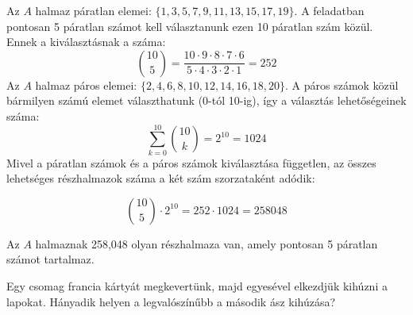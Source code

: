 \begin{solution}
Az $A$ halmaz páratlan elemei: $\{1,3,5,7,9,11,13,15,17,19\}$. A
feladatban pontosan 5 páratlan számot kell választanunk ezen 10 páratlan
szám közül. Ennek a kiválasztásnak a száma: 
\[
\binom{10}{5}=\frac{10\cdot9\cdot8\cdot7\cdot6}{5\cdot4\cdot3\cdot2\cdot1}=252
\]
Az $A$ halmaz páros elemei: $\{2,4,6,8,10,12,14,16,18,20\}$. A páros
számok közül bármilyen számú elemet választhatunk (0-tól 10-ig), így
a választás lehetőségeinek száma: 
\[
\sum_{k=0}^{10}\binom{10}{k}=2^{10}=1024
\]
Mivel a páratlan számok és a páros számok kiválasztása független,
az összes lehetséges részhalmazok száma a két szám szorzataként adódik:

\[
\binom{10}{5}\cdot2^{10}=252\cdot1024=258048
\]

Az $A$ halmaznak 258,048 olyan részhalmaza van, amely pontosan 5
páratlan számot tartalmaz. 
\end{solution}
\begin{extraproblem}
Egy csomag francia kártyát megkevertünk, majd egyesével elkezdjük
kihúzni a lapokat. Hányadik helyen a legvalószínűbb a második ász
kihúzása? 
\end{extraproblem}

